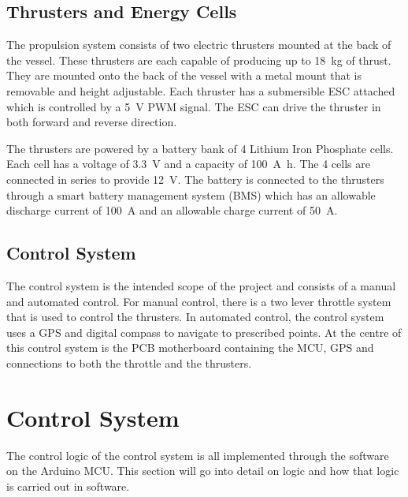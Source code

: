 \subsection{Thrusters and Energy Cells}
The propulsion system consists of two electric thrusters mounted at the back of the vessel. These thrusters are each capable of producing up to \SI{18}{\kilogram} of thrust. They are mounted onto the back of the vessel with a metal mount that is removable and height adjustable. Each thruster has a submersible ESC attached which is controlled by a \SI{5}{\volt} PWM signal. The ESC can drive the thruster in both forward and reverse direction.\par
\vspace{0.4cm}
The thrusters are powered by a battery bank of 4 Lithium Iron Phosphate cells. Each cell has a voltage of \SI{3.3}{\volt} and a capacity of \SI{100}{\ampere\hour}. The 4 cells are connected in series to provide \SI{12}{\volt}. The battery is connected to the thrusters through a smart battery management system (BMS) which has an allowable discharge current of \SI{100}{\ampere} and an allowable charge current of \SI{50}{\ampere}.\par
\subsection{Control System}
The control system is the intended scope of the project and consists of a manual and automated control. For manual control, there is a two lever throttle system that is used to control the thrusters. In automated control, the control system uses a GPS and digital compass to navigate to prescribed points. At the centre of this control system is the PCB motherboard containing the MCU, GPS and connections to both the throttle and the thrusters. \par
\section{Control System}
The control logic of the control system is all implemented through the software on the Arduino MCU. This section will go into detail on logic and how that logic is carried out in software. \par
